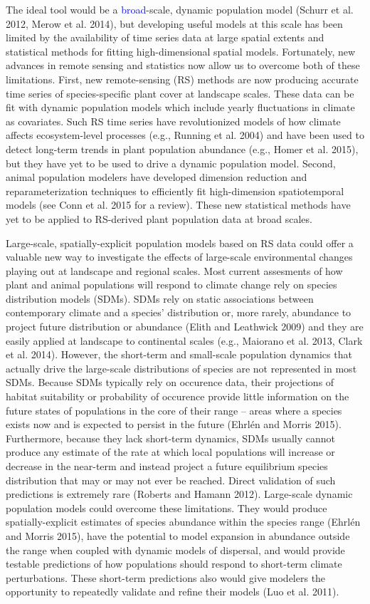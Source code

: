 \documentclass[12pt,]{article}
\begin{document}
The ideal tool would be a \textcolor{blue}{broad}-scale, dynamic
population model (Schurr et al. 2012, Merow et al. 2014), but developing
useful models at this scale has been limited by the availability of time
series data at large spatial extents and statistical methods for fitting
high-dimensional spatial models. Fortunately, new advances in remote
sensing and statistics now allow us to overcome both of these
limitations. First, new remote-sensing (RS) methods are now producing
accurate time series of species-specific plant cover at landscape
scales. These data can be fit with dynamic population models which
include yearly fluctuations in climate as covariates. Such RS time
series have revolutionized models of how climate affects ecosystem-level
processes (e.g., Running et al. 2004) and have been used to detect
long-term trends in plant population abundance (e.g., Homer et al.
2015), but they have yet to be used to drive a dynamic population model.
Second, animal population modelers have developed dimension reduction
and reparameterization techniques to efficiently fit high-dimension
spatiotemporal models (see Conn et al. 2015 for a review). These new
statistical methods have yet to be applied to RS-derived plant
population data at broad scales.

Large-scale, spatially-explicit population models based on RS data could
offer a valuable new way to investigate the effects of large-scale
environmental changes playing out at landscape and regional scales. Most
current assesments of how plant and animal populations will respond to
climate change rely on species distribution models (SDMs). SDMs rely on
static associations between contemporary climate and a species'
distribution or, more rarely, abundance to project future distribution
or abundance (Elith and Leathwick 2009) and they are easily applied at
landscape to continental scales (e.g., Maiorano et al. 2013, Clark et
al. 2014). However, the short-term and small-scale population dynamics
that actually drive the large-scale distributions of species are not
represented in most SDMs. Because SDMs typically rely on occurence data,
their projections of habitat suitability or probability of occurence
provide little information on the future states of populations in the
core of their range -- areas where a species exists now and is expected
to persist in the future (Ehrlén and Morris 2015). Furthermore, because
they lack short-term dynamics, SDMs usually cannot produce any estimate
of the rate at which local populations will increase or decrease in the
near-term and instead project a future equilibrium species distribution
that may or may not ever be reached. Direct validation of such
predictions is extremely rare (Roberts and Hamann 2012). Large-scale
dynamic population models could overcome these limitations. They would
produce spatially-explicit estimates of species abundance within the
species range (Ehrlén and Morris 2015), have the potential to model
expansion in abundance outside the range when coupled with dynamic
models of dispersal, and would provide testable predictions of how
populations should respond to short-term climate perturbations. These
short-term predictions also would give modelers the opportunity to
repeatedly validate and refine their models (Luo et al. 2011).
\end{document}
